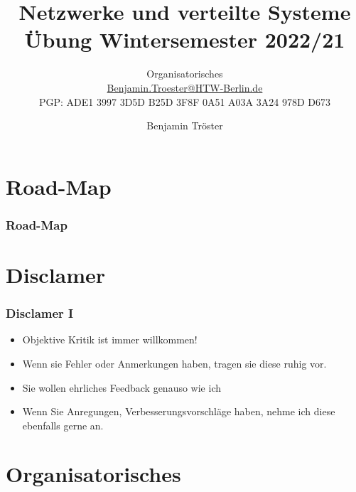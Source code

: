 \documentclass[xcolor=dvipsnames,aspectratio=169]{beamer}
\begin{document}

\title{Netzwerke und verteilte Systeme\\
Übung Wintersemester 2022/21}
\subtitle{Organisatorisches\\

\href{mailto:Benjamin.Troester@HTW-Berlin.de}{Benjamin.Troester@HTW-Berlin.de}\\
		PGP: ADE1 3997 3D5D B25D 3F8F 0A51 A03A 3A24 978D D673 }

\author{Benjamin Tröster}

\date{}

\begin{frame}
\titlepage
\end{frame}

\section*{Road-Map}
\begin{frame}
\frametitle{Road-Map}
\begin{multicols}{2}
  \tableofcontents
\end{multicols}
\end{frame}

\section{Disclamer}
\begin{frame}
	\frametitle{Disclamer I}
	\begin{itemize}
		\item Objektive Kritik ist immer willkommen!
		\item Wenn sie Fehler oder Anmerkungen haben, tragen sie diese ruhig vor.
		\item Sie wollen ehrliches Feedback genauso wie ich
		\item Wenn Sie Anregungen, Verbesserungsvorschläge haben, nehme ich diese ebenfalls gerne an.
	\end{itemize}
\end{frame}

\section{Organisatorisches}
\end{document}
